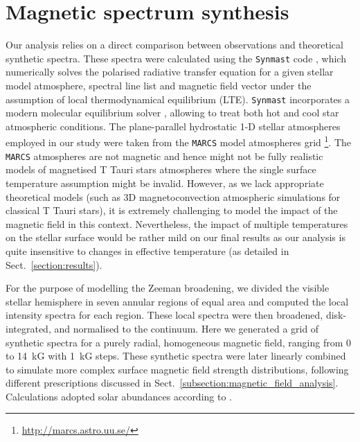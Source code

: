\documentclass{aa}
\begin{document}
\section{Magnetic spectrum synthesis}
\label{section:magnetic-spectrum-synthesis}
Our analysis relies on a direct comparison between observations and theoretical synthetic spectra. These spectra were calculated using the {\tt Synmast} code \citep{OK2007pms,2010A&A...524A...5K}, which numerically solves the polarised radiative transfer equation for a given stellar model atmosphere, spectral line list and magnetic field vector under the assumption of local thermodynamical equilibrium (LTE). {\tt Synmast} incorporates a modern molecular equilibrium solver \citep{2017A&A...597A..16P}, allowing to treat both hot and cool star atmospheric conditions. The plane-parallel hydrostatic 1-D stellar atmospheres employed in our study were taken from the {\tt MARCS} model atmospheres grid \citep{marcs2008}\footnote{\url{http://marcs.astro.uu.se/}}. The {\tt MARCS} atmospheres are not magnetic and hence might not be fully realistic models of magnetised T Tauri stars atmospheres where the single surface temperature assumption might be invalid. However, as we lack appropriate theoretical models (such as 3D magnetoconvection atmospheric simulations for classical T Tauri stars), it is extremely challenging to model the impact of the magnetic field in this context. Nevertheless, the impact of multiple temperatures on the stellar surface would be rather mild on our final results as our analysis is quite insensitive to changes in effective temperature (as detailed in Sect.~\ref{section:results}).

For the purpose of modelling the Zeeman broadening, we divided the visible stellar hemisphere in seven annular regions of equal area and computed the local intensity spectra for each region. These local spectra were then broadened, disk-integrated, and normalised to the continuum. Here we generated a grid of synthetic spectra for a purely radial, homogeneous magnetic field, ranging from 0 to 14~kG with 1~kG steps. These synthetic spectra were later linearly combined to simulate more complex surface magnetic field strength distributions, following different prescriptions discussed in Sect.~\ref{subsection:magnetic_field_analysis}. Calculations adopted solar abundances according to \citet{2009ARA&A..47..481A}.
\end{document}

